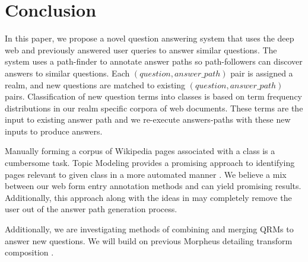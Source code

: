 \section{Conclusion}

In this paper, we propose a novel question answering system that uses the deep web and previously answered user queries to answer similar questions. The system uses a path-finder to annotate answer paths so path-followers can discover answers to similar questions.  Each $(question, answer\_path)$ pair is assigned a realm, and new questions are matched to existing $(question, answer\_path)$ pairs. Classification of new question terms into classes is based on term frequency distributions in our realm specific corpora of web documents.  These terms are the input to existing answer path and we re-execute answers-paths with these new inputs to produce answers.

Manually forming a corpus of Wikipedia pages associated with a class is a cumbersome task. Topic Modeling provides a promising approach to identifying pages relevant to given class in a more automated manner \cite{Blei2003latentdirichlet}. We believe a mix between our web form entry annotation methods and \cite{1453931} can yield promising results.  Additionally, this approach along with the ideas in \cite{1687749} may completely remove the user out of the answer path generation process.

Additionally, we are investigating methods of combining and merging QRMs to answer new questions.  We will build on previous Morpheus detailing transform composition \cite{transformscout}.



